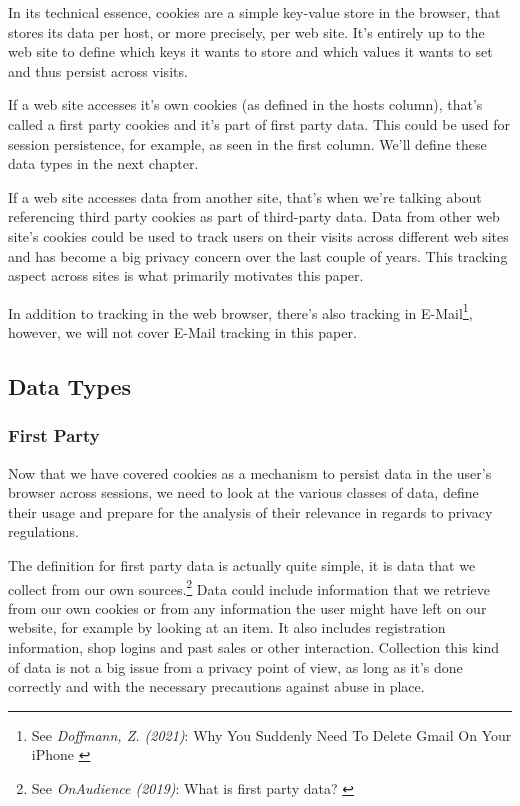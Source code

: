 In its technical essence, cookies are a simple key-value store in the browser, that stores its data per host, or more precisely, per web site. It's entirely up to the web site to define which keys it wants to store and which values it wants to set and thus persist across visits. 

If a web site accesses it's own cookies (as defined in the hosts column), that's called a first party cookies and it's part of first party data. This could be used for session persistence, for example, as seen in the first column. We'll define these data types in the next chapter.

If a web site accesses data from another site, that's when we're talking about referencing third party cookies as part of third-party data. Data from other web site's cookies could be used to track users on their visits across different web sites and has become a big privacy concern over the last couple of years. This tracking aspect across sites is what primarily motivates this paper.

In addition to tracking in the web browser, there's also tracking in E-Mail\footnote{See \textit{Doffmann, Z. (2021)}: Why You Suddenly Need To Delete Gmail On Your iPhone \cite{deleteGmail}}, however, we will not cover E-Mail tracking in this paper.

\subsection{Data Types}

\subsubsection{First Party}

Now that we have covered cookies as a mechanism to persist data in the user's browser across sessions, we need to look at the various classes of data, define their usage and prepare for the analysis of their relevance in regards to privacy regulations.

The definition for first party data is actually quite simple, it is data that we collect from our own sources.\footnote{See \textit{OnAudience (2019)}: What is first party data? \cite{firstParty}} Data could include information that we retrieve from our own cookies or from any information the user might have left on our website, for example by looking at an item. It also includes registration information, shop logins and past sales or other interaction. Collection this kind of data is not a big issue from a privacy point of view, as long as it's done correctly and with the necessary precautions against abuse in place.


